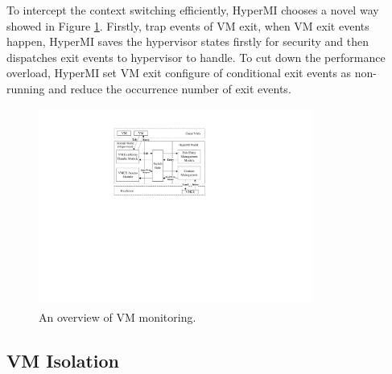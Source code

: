 \documentclass[conference]{IEEEtran}
\begin{document}
%
%
To intercept the context switching efficiently, HyperMI chooses a novel way showed in Figure \ref{fig4}. Firstly, trap events of VM exit, when VM exit events happen, HyperMI saves the hypervisor states firstly for security and then dispatches exit events to hypervisor to handle. To cut down the performance overload, HyperMI set VM exit configure of conditional exit events as non-running and reduce the occurrence number of exit events.

\begin{figure}
\centerline{\includegraphics[width=9cm,height=6.5cm]{pdfvmcs4.pdf}}%
\caption{An overview of VM monitoring.} \label{fig4}
\end{figure}







\subsection{VM Isolation}\label{VMISolation}
\end{document}
